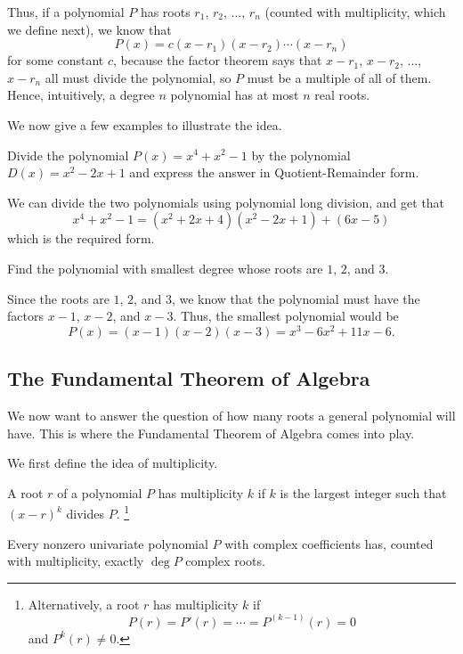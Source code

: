 \documentclass[11pt]{scrartcl}
\begin{document}
Thus, if a polynomial $P$ has roots $r_1$, $r_2$, $\dots$, $r_n$ (counted with multiplicity, which we define next), we know that \[P(x) = c(x-r_1)(x-r_2)\cdots(x-r_n)\] for some constant $c$, because the factor theorem says that $x-r_1$, $x-r_2$, $\dots$, $x-r_n$ all must divide the polynomial, so $P$ must be a multiple of all of them. Hence, intuitively, a degree $n$ polynomial has at most $n$ real roots.

We now give a few examples to illustrate the idea.

\begin{example*}
Divide the polynomial $P(x) = x^4+x^2-1$ by the polynomial $D(x) = x^2-2x+1$ and express the answer in Quotient-Remainder form.
\end{example*}

We can divide the two polynomials using polynomial long division, and get that \[x^4+x^2-1 = (x^2+2x+4)(x^2-2x+1)+(6x-5)\] which is the required form.

\begin{example*}
Find the polynomial with smallest degree whose roots are $1$, $2$, and $3$.
\end{example*}

Since the roots are $1$, $2$, and $3$, we know that the polynomial must have the factors $x-1$, $x-2$, and $x-3$. Thus, the smallest polynomial would be \[P(x) = (x-1)(x-2)(x-3) = x^3-6x^2+11x-6.\]

\subsection{The Fundamental Theorem of Algebra}

We now want to answer the question of how many roots a general polynomial will have. This is where the Fundamental Theorem of Algebra comes into play.

We first define the idea of multiplicity.

\begin{definition}[Multiplicity]
A root $r$ of a polynomial $P$ has multiplicity $k$ if $k$ is the largest integer such that $(x-r)^k$ divides $P$. \footnote{Alternatively, a root $r$ has multiplicity $k$ if \[P(r) = P'(r) = \cdots = P^{(k-1)}(r) = 0\] and $P^k(r) \neq 0$.}
\end{definition}

\begin{theorem}
Every nonzero univariate polynomial $P$ with complex coefficients has, counted with multiplicity, exactly $\deg P$ complex roots.
\end{theorem}
\end{document}

